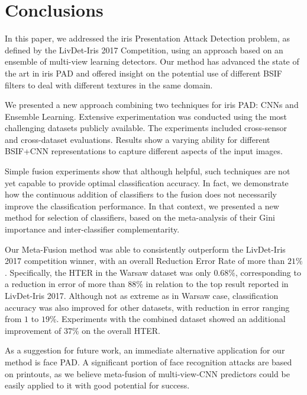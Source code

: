 \section{Conclusions}
\label{sec:conclusions}

In this paper, we addressed the iris Presentation Attack Detection problem, as defined by the LivDet-Iris 2017 Competition, using an approach based on an ensemble of multi-view learning detectors. Our method has advanced the state of the art in iris PAD and offered insight on the potential use of different BSIF filters to deal with different textures in the same domain.

We presented a new approach combining two techniques for iris PAD: CNNs and Ensemble Learning. Extensive experimentation was conducted using the most challenging datasets publicly available. The experiments included cross-sensor and cross-dataset evaluations. Results show a varying ability for different BSIF+CNN representations to capture different aspects of the input images.

Simple fusion experiments show that although helpful, such techniques are not yet capable to provide optimal classification accuracy.  In fact, we demonstrate how the continuous addition of classifiers to the fusion does not necessarily improve the classification performance. In that context, we presented a new method for selection of classifiers, based on the meta-analysis of their Gini importance and inter-classifier complementarity.

Our Meta-Fusion method was able to consistently outperform the LivDet-Iris 2017 competition winner, with an overall Reduction Error Rate of more than $21\%$. Specifically, the HTER in the Warsaw dataset was only $0.68\%$, corresponding to a reduction in error of more than 88\% in relation to the top result reported in LivDet-Iris 2017. Although not as extreme as in Warsaw case, classification accuracy was also improved for other datasets, with reduction in error ranging from $1$ to $19\%$. Experiments with the combined dataset showed an additional improvement of $37\%$ on the overall HTER.

As a suggestion for future work, an immediate alternative application for our method is face PAD. A significant portion of face recognition attacks are based on printouts, as we believe meta-fusion of multi-view-CNN predictors could be easily applied to it with good potential for success.

